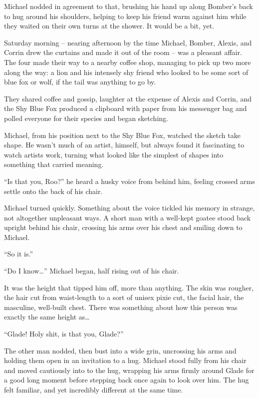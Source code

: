 Michael nodded in agreement to that, brushing his hand up along Bomber's back to hug around his shoulders, helping to keep his friend warm against him while they waited on their own turns at the shower. It would be a bit, yet.

\secdiv{}

Saturday morning -- nearing afternoon by the time Michael, Bomber, Alexis, and Corrin drew the curtains and made it out of the room -- was a pleasant affair. The four made their way to a nearby coffee shop, managing to pick up two more along the way: a lion and his intensely shy friend who looked to be some sort of blue fox or wolf, if the tail was anything to go by.

They shared coffee and gossip, laughter at the expense of Alexis and Corrin, and the Shy Blue Fox produced a clipboard with paper from his messenger bag and polled everyone for their species and began sketching.

Michael, from his position next to the Shy Blue Fox, watched the sketch take shape. He wasn't much of an artist, himself, but always found it fascinating to watch artists work, turning what looked like the simplest of shapes into something that carried meaning.

``Is that you, Roo?'' he heard a husky voice from behind him, feeling crossed arms settle onto the back of his chair.

Michael turned quickly. Something about the voice tickled his memory in strange, not altogether unpleasant ways. A short man with a well-kept goatee stood back upright behind his chair, crossing his arms over his chest and smiling down to Michael.

``So it is.''

``Do I know\ldots{}'' Michael began, half rising out of his chair.

It was the height that tipped him off, more than anything. The skin was rougher, the hair cut from waist-length to a sort of unisex pixie cut, the facial hair, the masculine, well-built chest. There was something about how this person was exactly the same height as\ldots{}

``Glade! Holy shit, is that you, Glade?''

The other man nodded, then bust into a wide grin, uncrossing his arms and holding them open in an invitation to a hug. Michael stood fully from his chair and moved cautiously into to the hug, wrapping his arms firmly around Glade for a good long moment before stepping back once again to look over him. The hug felt familiar, and yet incredibly different at the same time.

